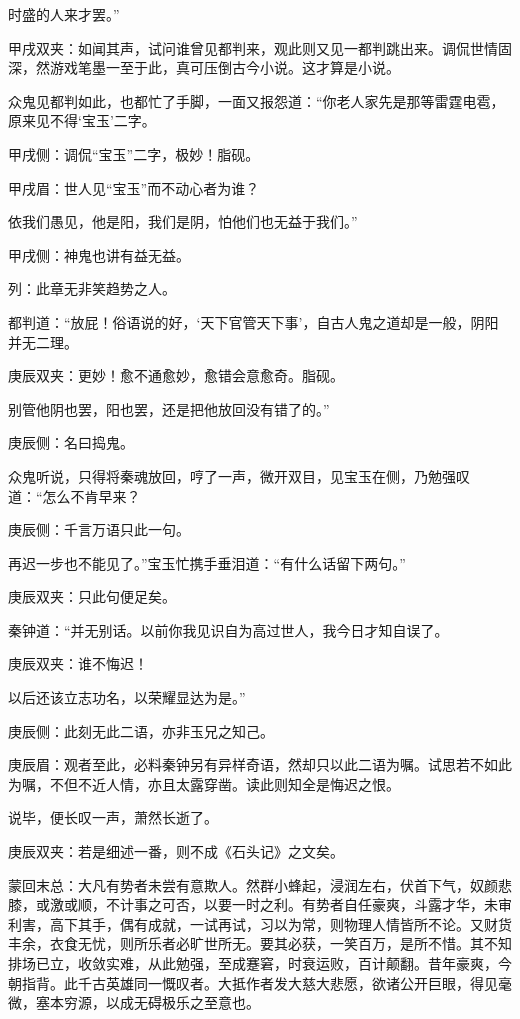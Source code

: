 \begin{parag}
时盛的人来才罢。”\begin{note}甲戌双夹：如闻其声，试问谁曾见都判来，观此则又见一都判跳出来。调侃世情固深，然游戏笔墨一至于此，真可压倒古今小说。这才算是小说。\end{note}众鬼见都判如此，也都忙了手脚，一面又报怨道：“你老人家先是那等雷霆电雹，原来见不得‘宝玉’二字。\begin{note}甲戌侧：调侃“宝玉”二字，极妙！脂砚。\end{note}\begin{note}甲戌眉：世人见“宝玉”而不动心者为谁？\end{note}依我们愚见，他是阳，我们是阴，怕他们也无益于我们。”\begin{note}甲戌侧：神鬼也讲有益无益。\end{note}\begin{note}列：此章无非笑趋势之人。\end{note}都判道：“放屁！俗语说的好，‘天下官管天下事’，自古人鬼之道却是一般，阴阳并无二理。\begin{note}庚辰双夹：更妙！愈不通愈妙，愈错会意愈奇。脂砚。\end{note}别管他阴也罢，阳也罢，还是把他放回没有错了的。”\begin{note}庚辰侧：名曰捣鬼。\end{note}众鬼听说，只得将秦魂放回，哼了一声，微开双目，见宝玉在侧，乃勉强叹道：“怎么不肯早来？\begin{note}庚辰侧：千言万语只此一句。\end{note}再迟一步也不能见了。”宝玉忙携手垂泪道：“有什么话留下两句。”\begin{note}庚辰双夹：只此句便足矣。\end{note}秦钟道：“并无别话。以前你我见识自为高过世人，我今日才知自误了。\begin{note}庚辰双夹：谁不悔迟！\end{note}以后还该立志功名，以荣耀显达为是。”\begin{note}庚辰侧：此刻无此二语，亦非玉兄之知己。\end{note}\begin{note}庚辰眉：观者至此，必料秦钟另有异样奇语，然却只以此二语为嘱。试思若不如此为嘱，不但不近人情，亦且太露穿凿。读此则知全是悔迟之恨。\end{note}说毕，便长叹一声，萧然长逝了。\begin{note}庚辰双夹：若是细述一番，则不成《石头记》之文矣。\end{note}
\end{parag}


\begin{parag}
    \begin{note}蒙回末总：大凡有势者未尝有意欺人。然群小蜂起，浸润左右，伏首下气，奴颜悲膝，或激或顺，不计事之可否，以要一时之利。有势者自任豪爽，斗露才华，未审利害，高下其手，偶有成就，一试再试，习以为常，则物理人情皆所不论。又财货丰余，衣食无忧，则所乐者必旷世所无。要其必获，一笑百万，是所不惜。其不知排场已立，收敛实难，从此勉强，至成蹇窘，时衰运败，百计颠翻。昔年豪爽，今朝指背。此千古英雄同一慨叹者。大抵作者发大慈大悲愿，欲诸公开巨眼，得见毫微，塞本穷源，以成无碍极乐之至意也。\end{note}
\end{parag}
